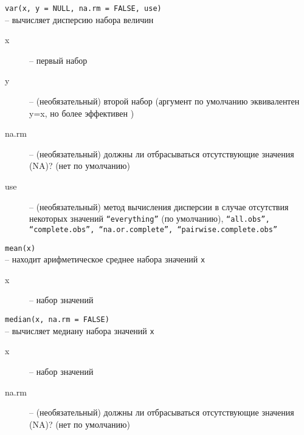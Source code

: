 \begin{enumerate}
\begin{mdframed}[style=BadassFrame]
              \texttt{var(x, y = NULL, na.rm = FALSE, use)} \\ -- вычисляет дисперсию набора величин
              \begin{description}

                \item[x] -- первый набор
                \item[y] -- (необязательный) второй набор (аргумент по умолчанию эквивалентен y=x, но более эффективен )
                \item[na.rm] -- (необязательный) должны ли отбрасываться отсутствующие значения (NA)? (нет по умолчанию)
                \item[use] -- (необязательный) метод вычисления дисперсии в случае отсутствия некоторых значений
                     \texttt{``everything''} (по умолчанию),  \texttt{``all.obs'', ``complete.obs'', ``na.or.complete'', ``pairwise.complete.obs''}
              \end{description}
        \end{mdframed}

		\begin{mdframed}[style=BadassFrame]

              \texttt{mean(x)} \\ 
              	-- находит арифметическое среднее набора значений \texttt{x}
              \begin{description}

                \item[x] -- набор значений
              \end{description}
        \end{mdframed}

        \begin{mdframed}[style=BadassFrame]

              \texttt{median(x, na.rm = FALSE)} \\
              	-- вычисляет медиану набора значений \texttt{x}
              \begin{description}

                \item[x] -- набор значений
                \item[na.rm] -- (необязательный) должны ли отбрасываться отсутствующие значения (NA)? (нет по умолчанию)
              \end{description}
        \end{mdframed}

        \begin{mdframed}[style=BadassFrame]


\end{mdframed}
\end{enumerate}
